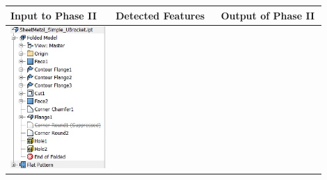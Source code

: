 \begin{minipage}[t]{\linewidth}
\begin{tabular}[h]{@{} p{0.3\linewidth} | p{0.3\linewidth} |  p{0.3\linewidth}@{}} \toprule

\textbf{Input to Phase II} & \textbf{Detected Features} & \textbf{Output of Phase II} \\ \midrule

\includegraphics[width=0.92\linewidth]{images/DefeatPhase_II_t1} &

\end{tabular}
\end{minipage}
